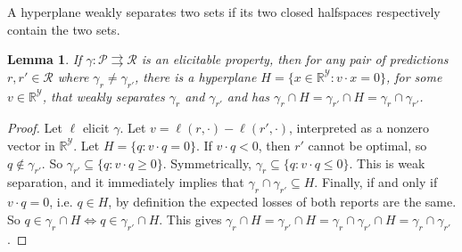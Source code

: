 \documentclass[11pt]{article} %
\newcommand{\Comments}{1}
\newcommand{\mytodo}[2]{\ifnum\Comments=1%
	\todo[linecolor=#1!80!black,backgroundcolor=#1,bordercolor=#1!80!black]{#2}\fi}
\newcommand{\btw}[1]{}%
\newcommand{\reals}{\mathbb{R}}
\newcommand{\R}{\mathcal{R}}
\renewcommand{\P}{\mathcal{P}}
\newcommand{\Y}{\mathcal{Y}}
\newcommand{\toto}{\rightrightarrows}
\newtheorem{lemma}{Lemma}
\begin{document}
A hyperplane weakly separates two sets if its two closed halfspaces respectively contain the two sets.
\begin{lemma}\label{lem:intersect-levelsets}
	If $\gamma: \P \toto \R$ is an elicitable property, then for any pair of predictions $r, r' \in \R$ where $\gamma_r \neq \gamma_{r'}$, there is a hyperplane $H = \{x \in \reals^{\Y} : v \cdot x = 0\}$, for some $v \in \reals^\Y$, that weakly separates $\gamma_r$ and $\gamma_{r'}$ and has $\gamma_r \cap H = \gamma_{r'} \cap H = \gamma_r \cap \gamma_{r'}$.
\end{lemma}
\begin{proof}
	\btw{Bo: the proof holds as written for the case where the level sets have empty intersection.}
	Let $\ell$ elicit $\gamma$.
	Let $v = \ell(r, \cdot) - \ell(r', \cdot)$, interpreted as a nonzero vector in $\reals^\Y$.
	Let $H = \{ q : v \cdot q = 0 \}$.
	If $v \cdot q < 0$, then $r'$ cannot be optimal, so $q \not\in \gamma_{r'}$.
	So $\gamma_{r'} \subseteq \{ q : v \cdot q \geq 0 \}$.
	Symmetrically, $\gamma_r \subseteq \{ q : v \cdot q \leq 0 \}$.
	This is weak separation, and it immediately implies that $\gamma_r \cap \gamma_{r'} \subseteq H$.
	Finally, if and only if $v \cdot q = 0$, i.e. $q \in H$, by definition the expected losses of both reports are the same.
	So $q \in \gamma_r \cap H \iff q \in \gamma_{r'} \cap H$.
	This gives $\gamma_r \cap H = \gamma_{r'} \cap H = \gamma_r \cap \gamma_{r'} \cap H = \gamma_r \cap \gamma_{r'}$.
\end{proof}
\end{document}
